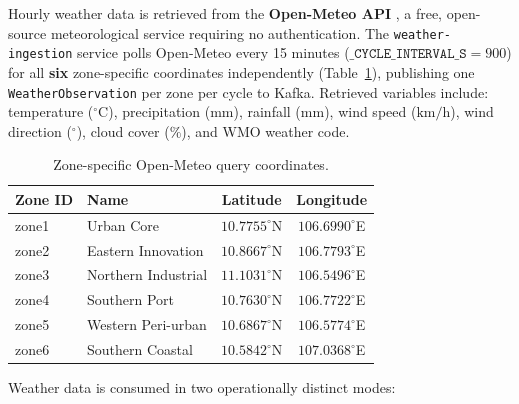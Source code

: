   Hourly weather data is retrieved from the \textbf{Open-Meteo API}
  \cite{openmeteo_api}, a free, open-source meteorological service
  requiring no authentication. The \texttt{weather-ingestion} service
  polls Open-Meteo every 15 minutes ($\texttt{\_CYCLE\_INTERVAL\_S} = 900$)
  for all \textbf{six} zone-specific coordinates independently
  (Table~\ref{tab:zone_coords}), publishing one \texttt{WeatherObservation}
  per zone per cycle to Kafka. Retrieved variables include:
  temperature ($^\circ$C), precipitation ($\text{mm}$), rainfall
  ($\text{mm}$), wind speed ($\text{km/h}$), wind direction ($^\circ$),
  cloud cover ($\%$), and WMO weather code.

  \begin{table}[h]
  \centering
  \caption{Zone-specific Open-Meteo query coordinates.}
  \label{tab:zone_coords}
  \small
  \begin{tabular}{llcc}
  \hline
  \textbf{Zone ID} & \textbf{Name} & \textbf{Latitude} & \textbf{Longitude} \\
  \hline
  zone1 & Urban Core           & $10.7755^\circ$N & $106.6990^\circ$E \\
  zone2 & Eastern Innovation   & $10.8667^\circ$N & $106.7793^\circ$E \\
  zone3 & Northern Industrial  & $11.1031^\circ$N & $106.5496^\circ$E \\
  zone4 & Southern Port        & $10.7630^\circ$N & $106.7722^\circ$E \\
  zone5 & Western Peri-urban   & $10.6867^\circ$N & $106.5774^\circ$E \\
  zone6 & Southern Coastal     & $10.5842^\circ$N & $107.0368^\circ$E \\
  \hline
  \end{tabular}
  \end{table}

  Weather data is consumed in two operationally distinct modes:

